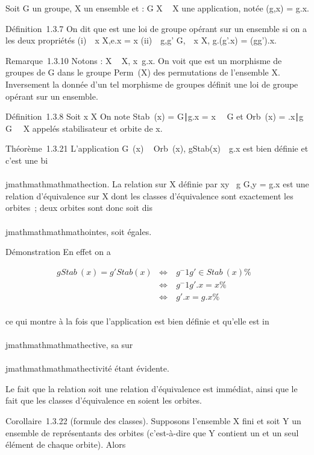 Soit G un groupe, X un ensemble et \phi : G \times X \rightarrow~ X une application, notée
\phi(g,x) = g.x.

Définition~1.3.7 On dit que \phi est une loi de groupe opérant sur un
ensemble si on a les deux propriétés (i)\forall~~x \in
X,e.x = x (ii)\forall~~g,g' \in
G,\forall~~x \in X, g.(g'.x) = (gg').x.

Remarque~1.3.10 Notons \sigmag : X \rightarrow~ X,
x\mapsto~g.x. On voit que \sigma est un morphisme de
groupes de G dans le groupe Perm~(X) des
permutations de l'ensemble X. Inversement la donnée d'un tel morphisme
de groupes définit une loi de groupe opérant sur un ensemble.

Définition~1.3.8 Soit x \in X On note Stab~(x) =
\g \in G∣g.x =
x\ \subset~ G et Orb~(x) =
\g.x∣g \in G\
\subset~ X appelés stabilisateur et orbite de x.

Théorème~1.3.21 L'application G\diagupStab~(x)
\rightarrow~ Orb~(x),
gStab(x)\mathrel\mapsto~~g.x est
bien définie et c'est une bi\\\\jmathmathmathmathection. La relation sur X définie par xy
\Leftrightarrow \exists~g \in G,y = g.x
est une relation d'équivalence sur X dont les classes d'équivalence sont
exactement les orbites~; deux orbites sont donc soit dis\\\\jmathmathmathmathointes, soit
égales.

Démonstration En effet on a

\begin{align*} gStab~(x) =
g'Stab(x)& \mathrel\Leftrightarrow~ &
g^-1g' \in Stab~(x)\%&
\\ & \Leftrightarrow &
g^-1g'.x = x \%& \\ &
\Leftrightarrow & g'.x = g.x \%&
\\ \end{align*}

ce qui montre à la fois que l'application est bien définie et qu'elle
est in\\\\jmathmathmathmathective, sa sur\\\\jmathmathmathmathectivité étant évidente.

Le fait que la relation soit une relation d'équivalence est immédiat,
ainsi que le fait que les classes d'équivalence en soient les orbites.

Corollaire~1.3.22 (formule des classes). Supposons l'ensemble X fini et
soit Y un ensemble de représentants des orbites (c'est-à-dire que Y
contient un et un seul élément de chaque orbite). Alors

